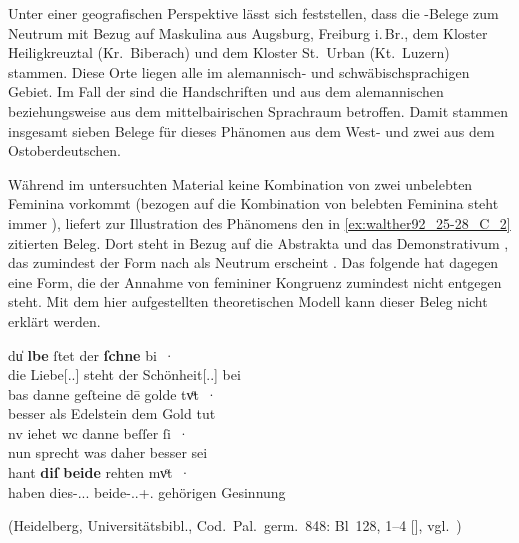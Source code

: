 Unter einer geografischen Perspektive lässt sich feststellen, dass die
\CAO{}-Belege zum Neutrum mit Bezug auf Maskulina aus Augsburg,
Freiburg i.\,Br., dem Kloster Heiligkreuztal (Kr.~Biberach) und dem Kloster
St.~Urban (Kt.~Luzern) stammen. Diese Orte liegen alle im alemannisch- und
schwäbischsprachigen Gebiet. Im Fall der \KC{} sind die Handschriften
\citet{kc:K} und \citet{kc:B1} aus dem alemannischen beziehungsweise aus dem
mittelbairischen Sprachraum betroffen. Damit stammen insgesamt sieben Belege
für dieses Phänomen aus dem West- und zwei aus dem Ost\-ober\-deutschen.

Während im untersuchten Material keine Kombination von zwei unbelebten Feminina
vorkommt (bezogen auf die Kombination von belebten Feminina steht immer
), liefert \citet[384]{paul2007} zur Illustration des Phänomens
den in \cref{ex:walther92_25-28_C_2} zitierten Beleg. Dort steht in Bezug auf
die Abstrakta   und   das
Demonstrativum  , das zumindest der Form nach als
Neutrum erscheint \autocite[485]{ksw2}. Das folgende  hat dagegen
eine Form, die der Annahme von femininer Kongruenz zumindest nicht entgegen
steht. Mit dem hier aufgestellten theoretischen Modell kann dieser Beleg nicht
erklärt werden.

\begin{exe}
\ex\label{ex:walther92_25-28_C_2}
	\gll du̍ \textbf{lbe} ſtet der \textbf{ſchne} bi~· \\
		die Liebe[\Nom.\Sg.\FemI] steht der Schönheit[\Dat.\Sg.\FemI] bei \\
\sn \gll bas danne geſteine dē golde tvͦt~· \\
		besser als Edelstein dem Gold tut \\
\sn \gll nv iehet wc danne beſſer ſi~· \\
		nun sprecht was daher besser sei \\
\sn \gll hant \textbf{diſ} \textbf{beide} rehten mvͦt~· \\
		haben dies-\Nom.\Pl.\NeutI{}.\St{} beide-\Nom.\Pl.\M+\F\subI.\St{} gehörigen Gesinnung \\
	\begin{taggedline}{(Heidelberg, Universitätsbibl., Cod.~Pal.~germ.~848: Bl~128\rb, 1--4 [\cite[4957]{hsc}], vgl.~\cite[356--358]{bein2013})}
	\trans {}
	\end{taggedline}
	\\
\end{exe}

